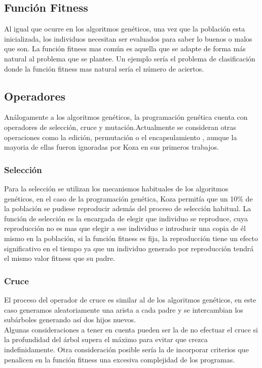 \documentclass[12pt]{article} \usepackage[utf8]{inputenc}
\begin{document}
\subsection{Función Fitness}

Al igual que ocurre en los algoritmos genéticos, una vez que la
población esta inicializada, los individuos necesitan ser evaluados
para saber lo buenos o malos que son. La función fitness mas
común es aquella que se adapte de forma más natural al problema que se
plantee. Un ejemplo sería el problema de clasificación donde la
función fitness mas natural sería el número de aciertos.

\subsection{Operadores}

Análogamente a los algoritmos genéticos, la programación genética
cuenta con operadores de selección, cruce y mutación.Actualmente se
consideran otras operaciones como la edición, permutación o el
encapsulamiento , aunque la mayoria de ellas fueron ignoradas por Koza
en sus primeros trabajos.

\subsubsection{Selección}

Para la selección se utilizan los mecanismos habituales de los
algoritmos genéticos, en el caso de la programación genética, Koza
permitía que un 10\% de la población se pudiese reproducir además del
proceso de selección habitual. La función de selección es la encargada
de elegir que individuo se reproduce, cuya reproducción no es mas que
elegir a ese individuo e introducir una copia de él mismo en la
población, si la función fitness es fija, la reproducción tiene un
efecto significativo en el tiempo ya que un individuo generado por
reproducción tendrá el mismo valor fitness que su padre.

\subsubsection{Cruce}

El proceso del operador de cruce es similar al de los algoritmos genéticos,
en este caso generamos aleatoriamente una arista a cada padre y se
intercambian los subárboles generando así dos hijos nuevos.\\

Algunas consideraciones a tener en cuenta pueden ser la de no efectuar
el cruce si la profundidad del árbol supera el máximo para evitar que
crezca indefinidamente. Otra consideración posible sería la de
incorporar criterios que penalicen en la función fitness una excesiva
complejidad de los programas.
\end{document}
